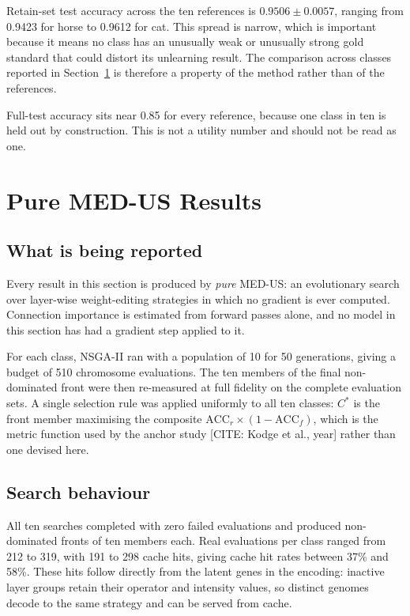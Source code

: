 Retain-set test accuracy across the ten references is
$0.9506 \pm 0.0057$, ranging from 0.9423 for horse to 0.9612 for cat. This spread
is narrow, which is important because it means no class has an unusually weak or
unusually strong gold standard that could distort its unlearning result. The
comparison across classes reported in Section~\ref{sec:exp-pure} is therefore a
property of the method rather than of the references.

Full-test accuracy sits near 0.85 for every reference, because one class in ten is
held out by construction. This is not a utility number and should not be read as
one.

\section{Pure MED-US Results}
\label{sec:exp-pure}

\subsection{What is being reported}

Every result in this section is produced by \emph{pure} MED-US: an evolutionary
search over layer-wise weight-editing strategies in which no gradient is ever
computed. Connection importance is estimated from forward passes alone, and no
model in this section has had a gradient step applied to it.

For each class, NSGA-II ran with a population of 10 for 50 generations, giving a
budget of 510 chromosome evaluations. The ten members of the final non-dominated
front were then re-measured at full fidelity on the complete evaluation sets. A
single selection rule was applied uniformly to all ten classes: $C^{*}$ is the
front member maximising the composite $\mathrm{ACC}_r \times (1 - \mathrm{ACC}_f)$,
which is the metric function used by the anchor study
[CITE: Kodge et al., year] rather than one devised here.

\subsection{Search behaviour}

All ten searches completed with zero failed evaluations and produced
non-dominated fronts of ten members each. Real evaluations per class ranged from
212 to 319, with 191 to 298 cache hits, giving cache hit rates between 37\% and
58\%. These hits follow directly from the latent genes in the encoding: inactive
layer groups retain their operator and intensity values, so distinct genomes
decode to the same strategy and can be served from cache.

